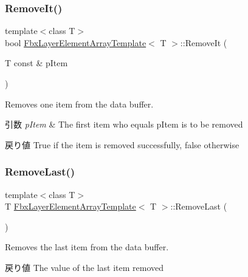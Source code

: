 \subsubsection{\texorpdfstring{Remove\+It()}{RemoveIt()}}
{\footnotesize\ttfamily template$<$class T$>$ \\
bool \hyperlink{class_fbx_layer_element_array_template}{Fbx\+Layer\+Element\+Array\+Template}$<$ T $>$\+::Remove\+It (\begin{DoxyParamCaption}\item[{T const \&}]{p\+Item }\end{DoxyParamCaption})}

Removes one item from the data buffer. 
\begin{DoxyParams}{引数}
{\em p\+Item} & The first item who equals p\+Item is to be removed \\
\hline
\end{DoxyParams}
\begin{DoxyReturn}{戻り値}
{\ttfamily True} if the item is removed successfully, {\ttfamily false} otherwise 
\end{DoxyReturn}
\mbox{\label{class_fbx_layer_element_array_template_ac5f508f41799c5f3f2e0c045ab874063}} 
\subsubsection{\texorpdfstring{Remove\+Last()}{RemoveLast()}}
{\footnotesize\ttfamily template$<$class T$>$ \\
T \hyperlink{class_fbx_layer_element_array_template}{Fbx\+Layer\+Element\+Array\+Template}$<$ T $>$\+::Remove\+Last (\begin{DoxyParamCaption}{ }\end{DoxyParamCaption})}

Removes the last item from the data buffer. \begin{DoxyReturn}{戻り値}
The value of the last item removed 
\end{DoxyReturn}
\mbox{\label{class_fbx_layer_element_array_template_a70cf4f9a1b142eff8adae13ad1a79e6d}} 
